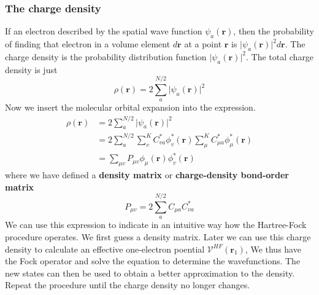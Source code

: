 \documentclass[11pt]{article}
\begin{document}
\subsubsection{The charge density}
If an electron described by the spatial wave function $\psi_a(\mathbf{r})$, then the probability of finding that
electron in a volume element $d\mathbf{r}$ at a point $\mathbf{r}$ is ${\lvert \psi_a(\mathbf{r})\rvert}^2 d\mathbf{r}$.
The charge density is the probability distribution function ${\lvert \psi_a(\mathbf{r})\rvert}^2$. The total charge
density is just
\begin{equation}
    \rho(\mathbf{r})=2\sum_{a}^{N/2}{\lvert \psi_a(\mathbf{r})\rvert}^2
\end{equation}
Now we insert the molecular orbital expansion into the expression.
\begin{equation}
    \begin{split}
        \rho(\mathbf{r})&=2\sum_{a}^{N/2}{\lvert \psi_a(\mathbf{r})\rvert}^2\\
        &=2\sum_{a}^{N/2}\sum_{v}^{K}C_{va}^*\phi_v^*(\mathbf{r})\sum_{\mu}^{K}C_{\mu a}^*\phi_\mu^*(\mathbf{r})\\
        &=\sum_{\mu v}P_{\mu v}\phi_\mu(\mathbf{r})\phi_v^*(\mathbf{r})
    \end{split}
\end{equation}
where we have defined a \textbf{density matrix} or \textbf{charge-density bond-order matrix}
\begin{equation}
    P_{\mu v}=2\sum_{a}^{N/2}C_{\mu a}C_{va}^*
\end{equation}
We can use this expression to indicate in an intuitive way how the Hartree-Fock procedure operates. We first guess a density
matrix. Later we can use this charge density to calculate an effective one-electron poential $\mathcal{V}^{HF}(\mathbf{r}_1)$,
We thus have the Fock operator and solve the equation to determine the wavefunctions. The new states can then be used to obtain
a better approximation to the density. Repeat the procedure until the charge density no longer changes.
\end{document}
